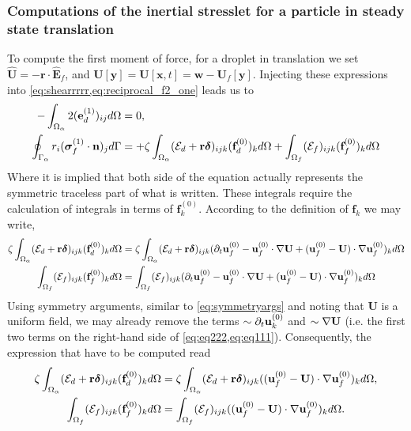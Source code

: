 \subsubsection{Computations of the inertial stresslet for a particle in steady state translation}

To compute the first moment of force, for a droplet in translation we set $\hat{\textbf{U}} = - \textbf{r} \cdot \hat{\textbf{E}}_f$, and $\textbf{U}[\textbf{y}] = \textbf{U}[\textbf{x},t] = \textbf{w} - \textbf{U}_f[\textbf{y}]$. 
Injecting these expressions into \ref{eq:shearrrrr,eq:reciprocal_f2_one} leads us to
\begin{align}
    - \intO{
        2(\textbf{e}_d^{(1)})_{ij}
   }
    &= 0, \\
    \intS{r_i (\bm\sigma_f^{(1)} \cdot \textbf{n})_j}
    &= 
    + \zeta\intO{(\mathcal{E}_d + \textbf{r}\bm\delta)_{ijk} (\textbf{f}_d^{(0)})_k }
    + \intOf{(\mathcal{E}_f )_{ijk}  (\textbf{f}^{(0)}_f)_k}
    \label{eq:stresslet}
    \\
\end{align}
Where it is implied that both side of the equation actually represents the symmetric traceless part of what is written.
These integrals require the calculation of integrals in terms of $\textbf{f}^{(0)}_k$. 
According to the definition of $\textbf{f}_k$ we may write, 
\begin{align}
    \label{eq:eq111}
    \zeta\intO{(\mathcal{E}_d + \textbf{r}\bm\delta)_{ijk} (\textbf{f}_d^{(0)})_k }
    &=
    \zeta\intO{(\mathcal{E}_d + \textbf{r}\bm\delta)_{ijk} 
    (
    \pddt \textbf{u}_f^{(0)}
    - \textbf{u}_f^{(0)} \cdot \grad \textbf{U}
    + (\textbf{u}_f^{(0)} - \textbf{U})\cdot \grad \textbf{u}_f^{(0)}
    )_k }\\
    \intOf{(\mathcal{E}_f )_{ijk}  (\textbf{f}^{(0)}_f)_k}
    &=
    \intOf{(\mathcal{E}_f )_{ijk}  
    (\pddt \textbf{u}_f^{(0)}
    - \textbf{u}_f^{(0)} \cdot \grad \textbf{U}
    + (\textbf{u}_f^{(0)} - \textbf{U})\cdot \grad \textbf{u}_f^{(0)}
    )_k}
    \label{eq:eq222}
\end{align}
Using symmetry arguments, similar to \ref{eq:symmetryargs} and noting that  \textbf{U} is a uniform field, we may already remove the terms $\sim \partial_t \textbf{u}^{(0)}_k$ and $\sim \mathbf{\nabla} \textbf{U}$ (i.e. the first two terms on the right-hand side of \ref{eq:eq222,eq:eq111}). 
Consequently, the expression that have to be computed read
\begin{align}
    \zeta\intO{(\mathcal{E}_d + \textbf{r}\bm\delta)_{ijk} (\textbf{f}_d^{(0)})_k }
    &=
    \zeta\intO{(\mathcal{E}_d + \textbf{r}\bm\delta)_{ijk} 
    ( (\textbf{u}_f^{(0)} - \textbf{U})\cdot \grad \textbf{u}_f^{(0)}
    )_k },
    \label{eq:eq111222}
    \\
    \intOf{(\mathcal{E}_f )_{ijk}  (\textbf{f}^{(0)}_f)_k}
    &=
    \intOf{(\mathcal{E}_f )_{ijk}  
    ((\textbf{u}_f^{(0)} - \textbf{U})\cdot \grad \textbf{u}_f^{(0)}
    )_k}. 
    \label{eq:eq222222222}
\end{align}
